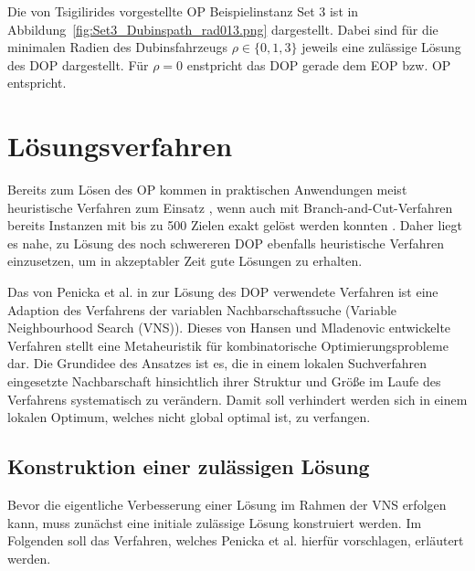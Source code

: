 \documentclass[12pt,a4paper,twoside]{article}
\theoremstyle{definition}
\numberwithin{equation}{section}
\begin{document}
Die von Tsigilirides \cite{Tsiligirides.1984} vorgestellte OP Beispielinstanz Set 3 ist in Abbildung~\ref{fig:Set3_Dubinspath_rad013.png} dargestellt. Dabei sind für die minimalen Radien des Dubinsfahrzeugs $\rho \in \{0,1,3\}$ jeweils eine zulässige Lösung des DOP dargestellt. Für $\rho = 0$ enstpricht das DOP gerade dem EOP bzw. OP entspricht.

\clearpage

\section{Lösungsverfahren}\label{section:Loesungsverfahren}
Bereits zum Lösen des OP kommen in praktischen Anwendungen meist heuristische Verfahren zum Einsatz \cite{Vansteenwegen.2011}, wenn auch mit Branch-and-Cut-Verfahren bereits Instanzen mit bis zu 500 Zielen exakt gelöst werden konnten \cite{Fischetti.1998}. Daher liegt es nahe, zu Lösung des noch schwereren DOP ebenfalls heuristische Verfahren einzusetzen, um in akzeptabler Zeit gute Lösungen zu erhalten.

Das von Penicka et al. in \cite{R.Penicka.2017} zur Lösung des DOP verwendete Verfahren ist eine Adaption des Verfahrens der variablen Nachbarschaftssuche (Variable Neighbourhood Search (VNS)). Dieses von Hansen und Mladenovic \cite{Hansen.2001} entwickelte Verfahren stellt eine Metaheuristik für kombinatorische Optimierungsprobleme dar. Die Grundidee des Ansatzes ist es, die in einem lokalen Suchverfahren eingesetzte Nachbarschaft hinsichtlich ihrer Struktur und Größe im Laufe des Verfahrens systematisch zu verändern. Damit soll verhindert werden sich in einem lokalen Optimum, welches nicht global optimal ist, zu verfangen.

\subsection{Konstruktion einer zulässigen Lösung}\label{subsection:construction}
Bevor die eigentliche Verbesserung einer Lösung im Rahmen der VNS erfolgen kann, muss zunächst eine initiale zulässige Lösung konstruiert werden. Im Folgenden soll das Verfahren, welches Penicka et al. \cite{R.Penicka.2017} hierfür vorschlagen, erläutert werden. 
\end{document}
